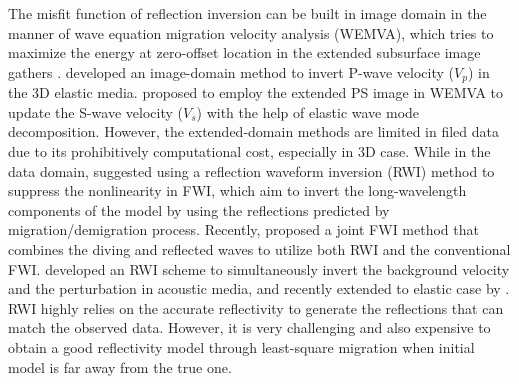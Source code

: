 The misfit function of reflection inversion can be built in image domain in the manner of wave equation migration
velocity analysis (WEMVA), which tries to maximize the
energy at zero-offset location in the extended subsurface image gathers
\cite[]{Symes2008,Almomin2012,SunEtAl2012,biondi2013}.
\cite{RaknesEtAl2016} 
developed an image-domain method to invert P-wave velocity ($V_p$) in the 3D elastic media. 
\cite{Wang2017WEMVA} proposed to employ the extended PS image in WEMVA to update the
S-wave velocity ($V_s$) with the help of elastic wave mode decomposition.
However, the extended-domain methods are limited in filed data due to its prohibitively computational cost,
especially in 3D case.
While in the data domain,
\cite{xu:2012} suggested using a reflection waveform inversion (RWI) method to suppress the
nonlinearity in FWI, 
which aim to invert the long-wavelength components of the model by using the reflections 
predicted by migration/demigration process.
Recently, \cite{Zhou2015} proposed a joint FWI method that combines the diving and reflected waves to
utilize both RWI and the conventional FWI.
\cite{Wu2015b} developed an RWI scheme to simultaneously invert the background velocity and the
perturbation in acoustic media,  and recently extended to elastic case by
\cite{Guo2016}.
RWI highly relies on the accurate reflectivity to generate the reflections that can match the
observed data. However, it is very challenging and also expensive to obtain a good reflectivity model through 
least-square migration when initial model is far away from the true one.

